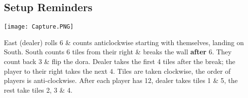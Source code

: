 \documentclass[8pt,a4paper]{extarticle}
\begin{document}
\begin{multicols*}{5}
\section*{Setup Reminders}

\texttt{[image: Capture.PNG]}

East (dealer) rolls 6 \& counts anticlockwise starting with themselves, landing on South. South counts 6 tiles from their right \& breaks the wall \textbf{after} 6. They count back 3 \& flip the dora. Dealer takes the first 4 tiles after the break; the player to their right takes the next 4. Tiles are taken clockwise, the order of players is anti-clockwise. After each player has 12, dealer takes tiles 1 \& 5, the rest take tiles 2, 3 \& 4.


\end{multicols*}
\end{document}
